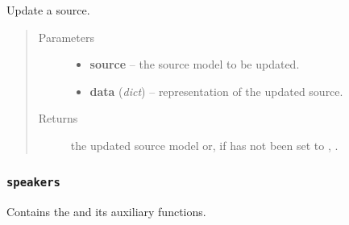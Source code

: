 \documentclass[letterpaper,10pt,english]{sphinxmanual}
\begin{document}

\begin{fulllineitems}
\label{api:onlinelinguisticdatabase.controllers.sources.updateSource}
Update a source.
\begin{quote}\begin{description}
\item[{Parameters}] \leavevmode\begin{itemize}
\item {} 
\textbf{source} -- the source model to be updated.

\item {} 
\textbf{data} (\emph{dict}) -- representation of the updated source.

\end{itemize}

\item[{Returns}] \leavevmode
the updated source model or, if  has not been set
to , .

\end{description}\end{quote}

\end{fulllineitems}



\subsubsection{\texttt{speakers}}
\label{api:speakers}\label{api:module-onlinelinguisticdatabase.controllers.speakers}
Contains the {\hyperref[api:onlinelinguisticdatabase.controllers.speakers.SpeakersController]{}} and its auxiliary functions.
\label{api:module-speakers}
\end{document}
